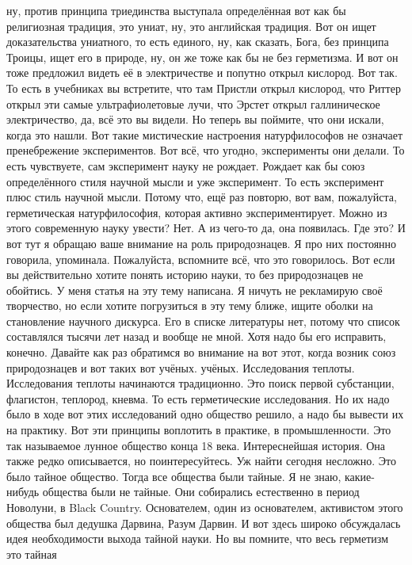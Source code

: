 ну, против принципа триединства выступала определённая вот как бы религиозная
традиция, это униат, ну, это английская традиция. Вот он ищет доказательства
униатного, то есть единого, ну, как сказать, Бога, без принципа Троицы, ищет его
в природе, ну, он же тоже как бы не без герметизма. И вот он тоже предложил
видеть её в электричестве и попутно открыл кислород. Вот так. То есть в
учебниках вы встретите, что там Пристли открыл кислород, что Риттер открыл эти
самые ультрафиолетовые лучи, что Эрстет открыл галлиническое электричество, да,
всё это вы видели. Но теперь вы поймите, что они искали, когда это нашли. Вот
такие мистические настроения натурфилософов не означает пренебрежение
экспериментов. Вот всё, что угодно, эксперименты они делали. То есть чувствуете,
сам эксперимент науку не рождает. Рождает как бы союз определённого стиля
научной мысли и уже эксперимент. То есть эксперимент плюс стиль научной мысли.
Потому что, ещё раз повторю, вот вам, пожалуйста, герметическая натурфилософия,
которая активно экспериментирует. Можно из этого современную науку увести? Нет.
А из чего-то да, она появилась. Где это? И вот тут я обращаю ваше внимание на
роль природознацев. Я про них постоянно говорила, упоминала. Пожалуйста,
вспомните всё, что это говорилось. Вот если вы действительно хотите понять
историю науки, то без природознацев не обойтись. У меня статья на эту тему
написана. Я ничуть не рекламирую своё творчество, но если хотите погрузиться в
эту тему ближе, ищите оболки на становление научного дискурса. Его в списке
литературы нет, потому что список составлялся тысячи лет назад и вообще не мной.
Хотя надо бы его исправить, конечно. Давайте как раз обратимся во внимание на
вот этот, когда возник союз природознацев и вот таких вот учёных. учёных.
Исследования теплоты. Исследования теплоты начинаются традиционно. Это поиск
первой субстанции, флагистон, теплород, кневма. То есть герметические
исследования. Но их надо было в ходе вот этих исследований одно общество решило,
а надо бы вывести их на практику. Вот эти принципы воплотить в практике, в
промышленности. Это так называемое лунное общество конца 18 века. Интереснейшая
история. Она также редко описывается, но поинтересуйтесь. Уж найти сегодня
несложно. Это было тайное общество. Тогда все общества были тайные. Я не знаю,
какие-нибудь общества были не тайные. Они собирались естественно в период
Новолуни, в Black Country. Основателем, один из основателем, активистом этого
общества был дедушка Дарвина, Разум Дарвин. И вот здесь широко обсуждалась идея
необходимости выхода тайной науки. Но вы помните, что весь герметизм это тайная
